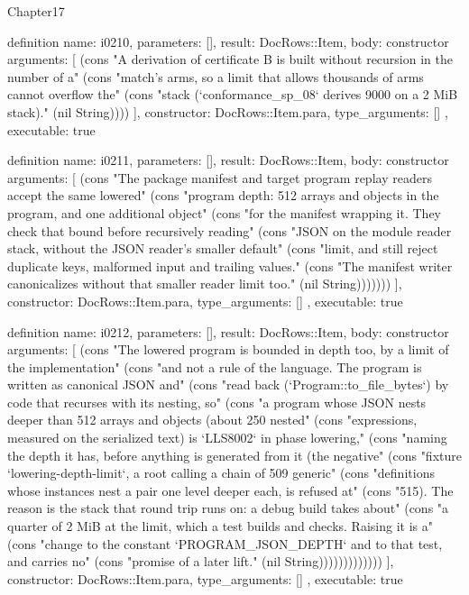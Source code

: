 \begin{lexlean}{Chapter17}
\begin{semanticmodule}
definition{
  name: i0210,
  parameters: [],
  result: DocRows::Item,
  body: constructor{
    arguments: [
      (cons "A derivation of certificate B is built without recursion in the number of a" (cons "match's arms, so a limit that allows thousands of arms cannot overflow the" (cons "stack (`conformance_sp_08` derives 9000 on a 2 MiB stack)." (nil String))))
    ],
    constructor: DocRows::Item.para,
    type_arguments: []
  },
  executable: true
}

definition{
  name: i0211,
  parameters: [],
  result: DocRows::Item,
  body: constructor{
    arguments: [
      (cons "The package manifest and target program replay readers accept the same lowered" (cons "program depth: 512 arrays and objects in the program, and one additional object" (cons "for the manifest wrapping it. They check that bound before recursively reading" (cons "JSON on the module reader stack, without the JSON reader's smaller default" (cons "limit, and still reject duplicate keys, malformed input and trailing values." (cons "The manifest writer canonicalizes without that smaller reader limit too." (nil String)))))))
    ],
    constructor: DocRows::Item.para,
    type_arguments: []
  },
  executable: true
}

definition{
  name: i0212,
  parameters: [],
  result: DocRows::Item,
  body: constructor{
    arguments: [
      (cons "The lowered program is bounded in depth too, by a limit of the implementation" (cons "and not a rule of the language. The program is written as canonical JSON and" (cons "read back (`Program::to_file_bytes`) by code that recurses with its nesting, so" (cons "a program whose JSON nests deeper than 512 arrays and objects (about 250 nested" (cons "expressions, measured on the serialized text) is `LLS8002` in phase lowering," (cons "naming the depth it has, before anything is generated from it (the negative" (cons "fixture `lowering-depth-limit`, a root calling a chain of 509 generic" (cons "definitions whose instances nest a pair one level deeper each, is refused at" (cons "515). The reason is the stack that round trip runs on: a debug build takes about" (cons "a quarter of 2 MiB at the limit, which a test builds and checks. Raising it is a" (cons "change to the constant `PROGRAM_JSON_DEPTH` and to that test, and carries no" (cons "promise of a later lift." (nil String)))))))))))))
    ],
    constructor: DocRows::Item.para,
    type_arguments: []
  },
  executable: true
}


\end{semanticmodule}
\end{lexlean}
